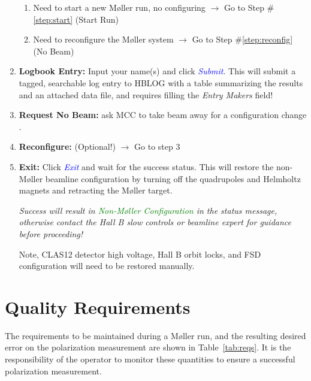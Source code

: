 \documentclass[amsmath,amssymb,notitlepage,12pt]{revtex4}
\begin{document}
\begin{enumerate}
\begin{enumerate}
            \item Need to start a new M{\o}ller run, no configuring $\to$ Go to Step \#\ref{step:start} (Start Run)
            \item Need to reconfigure the M{\o}ller system $\to$ Go to Step \#\ref{step:reconfig} (No Beam)
        \end{enumerate}
    \item {\bf Logbook Entry:} Input your name(s) and click \textcolor{blue}{\em Submit}\label{step:log}.
        This will submit a tagged, searchable log entry to HBLOG with a table summarizing the results and an attached data file, and requires filling the {\em Entry Makers} field!
    \item {\bf Request No Beam:} ask MCC to take beam away for a configuration change \label{step:reconfig}.
    \item {\bf Reconfigure:} (Optional!) $\to$ Go to step 3
    \item {\bf Exit:} Click \textcolor{blue}{\em Exit} and wait for the success status.  
        This will restore the non-M{\o}ller beamline configuration by turning off the quadrupoles and Helmholtz magnets and retracting the M{\o}ller target.  
        \begin{adjustwidth}{1cm}{1cm}
            {\em Success will result in \textcolor{green}{\em Non-M{\o}ller Configuration} in the status message, otherwise contact the Hall B slow controls or beamline expert for guidance before proceeding!}
        \end{adjustwidth}
        Note, CLAS12 detector high voltage, Hall B orbit locks, and FSD configuration will need to be restored manually.
\end{enumerate}

\section{Quality Requirements}\label{sec:quality}

The requirements to be maintained during a M{\o}ller run, and the resulting desired error on the polarization measurement are shown in Table~\ref{tab:reqs}.  It is the responsibility of the operator to monitor these quantities to ensure a successful polarization measurement.
\end{document}
